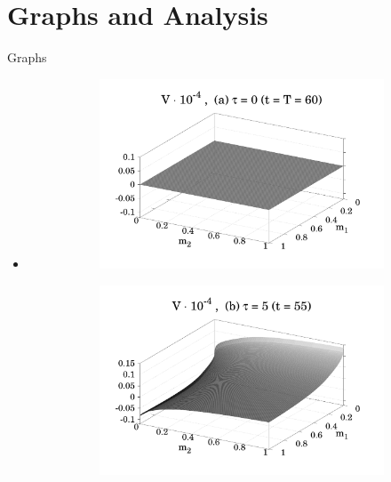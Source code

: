 \documentclass{beamer}
\begin{document}
\section{Graphs and Analysis}
\begin{frame}{Graphs}
\begin{itemize}
    \item<1> \begin{figure}
        \centering
        \begin{subfigure}{.48 \textwidth}
            \includegraphics[width = \textwidth]{figures/Figure_4a.pdf}
            \label{fig_4_a}
        \end{subfigure}
        \begin{subfigure}{.48 \textwidth}
            \includegraphics[width = \textwidth]{figures/Figure_4b_1.pdf}
            \label{fig_4_b}
        \end{subfigure}

\end{figure}
\end{itemize}
\end{frame}
\end{document}
